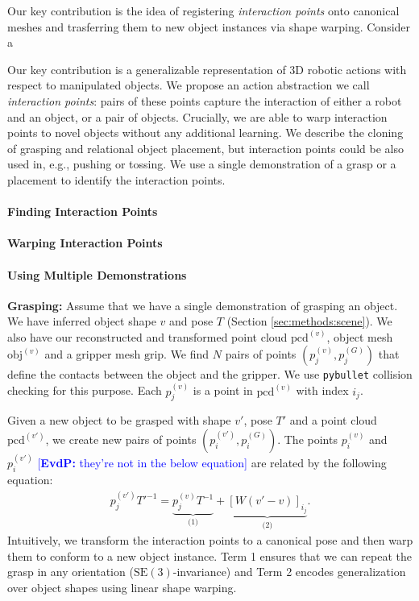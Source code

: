\documentclass{article}
\newcommand{\evdp}[1]{\textcolor{blue}{[\textbf{EvdP:} #1]}}
\newcommand{\pcx}[1]{\mathrm{pcd}^{(#1)}}
\begin{document}
Our key contribution is the idea of registering \textit{interaction points} onto canonical meshes and trasferring them to new object instances via shape warping. Consider a 

Our key contribution is a generalizable representation of 3D robotic actions with respect to manipulated objects. We propose an action abstraction we call \textit{interaction points}: pairs of these points capture the interaction of either a robot and an object, or a pair of objects. Crucially, we are able to warp interaction points to novel objects without any additional learning. We describe the cloning of grasping and relational object placement, but interaction points could be also used in, e.g., pushing or tossing. We use a single demonstration of a grasp or a placement to identify the interaction points.

\paragraph{Finding Interaction Points} 

\paragraph{Warping Interaction Points}

\paragraph{Using Multiple Demonstrations}

\textbf{Grasping:} Assume that we have a single demonstration of grasping an object. We have inferred object shape $v$ and pose $T$ (Section \ref{sec:methods:scene}). We also have our reconstructed and transformed point cloud $\pcx{v}$, object mesh $\mathrm{obj}^{(v)}$ and a gripper mesh $\mathrm{grip}$. We find $N$ pairs of points $(p^{(v)}_j, p^{(G)}_j)$ that define the contacts between the object and the gripper. We use \texttt{pybullet} collision checking for this purpose. Each $p^{(v)}_j$ is a point in $\pcx{v}$ with index $i_j$.

Given a new object to be grasped with shape $v'$, pose $T'$ and a point cloud $\pcx{v'}$, we create new pairs of points $(p^{(v')}_i, p^{(G)}_i)$. The points $p^{(v)}_i$ and $p^{(v')}_i$ \evdp{they're not in the below equation} are related by the following equation:
\begin{align}
    p^{(v')}_j T'^{-1} = \underbrace{p^{(v)}_j T^{-1}}_{\text{(1)}} + \underbrace{[W(v' - v)]_{i_j}}_{\text{(2)}} \label{eq:contact_point_warping}.
\end{align}
Intuitively, we transform the interaction points to a canonical pose and then warp them to conform to a new object instance. Term 1 ensures that we can repeat the grasp in any orientation ($\mathrm{SE}(3)$-invariance) and Term 2 encodes generalization over object shapes using linear shape warping.
\end{document}
